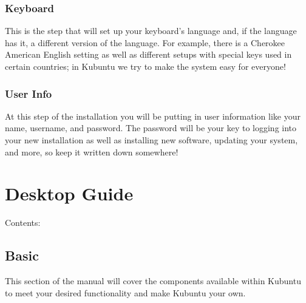 \documentclass[letterpaper,10pt,english]{sphinxmanual}
\begin{document}


\subsection{Keyboard}
\label{\detokenize{docs/installation:keyboard}}
\sphinxAtStartPar
This is the step that will set up your keyboard’s language and, if the language has it, a different version of the language. For example, there is a Cherokee American English setting as well as different setups with special keys used in certain countries; in Kubuntu we try to make the system easy for everyone!



\subsection{User Info}
\label{\detokenize{docs/installation:user-info}}
\sphinxAtStartPar
At this step of the installation you will be putting in user information like your name, username, and password. The password will be your key to logging into your new installation as well as installing new software, updating your system, and more, so keep it written down somewhere!



\chapter{Desktop Guide}
\label{\detokenize{docs/desktop-guide/desktop-list:desktop-guide}}\label{\detokenize{docs/desktop-guide/desktop-list::doc}}
\sphinxAtStartPar
Contents:


\section{Basic}
\label{\detokenize{docs/desktop-guide/basic:basic}}\label{\detokenize{docs/desktop-guide/basic:basic-link}}\label{\detokenize{docs/desktop-guide/basic::doc}}
\sphinxAtStartPar
This section of the manual will cover the components available within Kubuntu to meet your desired functionality and make Kubuntu your own.
\end{document}
